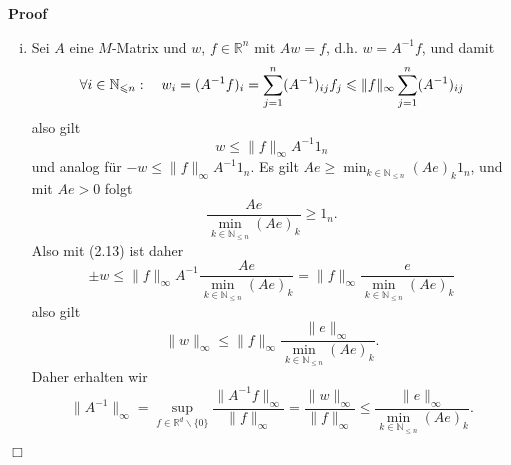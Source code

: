 \documentclass{book}
\newenvironment{enumerateroman}{\begin{enumerate}[i.] }{\end{enumerate}}
\newenvironment{proof}{\noindent\textbf{Proof\ }}{\hspace*{\fill}$\Box$\medskip}
\begin{document}
\begin{proof}
\begin{enumerateroman}
    Insgesamt ist $\| P \|_e = \sup_{\| x \|_e = 1} \| P x \|_e = \| P e \|_e
    = \max_{i \in \mathbb{N}_{\leqslant n}} \frac{(P e)_i}{e_i}$.
    
    Wegen $P e < e$ aus (2.12) gilt
    \[ \| P \|_e = \| P e \|_e < \| e \|_e = 1 \]
    und damit ist $I - P$ invertierbar wobei die Inverse mittels Neumann'sche
    Reihe darzustellen ist, also
    \[ (I - P)^{- 1} = \sum_{j = 0}^{\infty} P^j . \]
    {\hspace{1.7em}}Wegen $A = D (I - P)$ existiert auch $A^{- 1} = (I - P)^{-
    1} D^{- 1}$.
    
    Mit $P \geq 0$ ist $P^j \geqslant 0$ also $(I - P)^{- 1} \geq 0$, und da
    noch $D^{- 1} \geqslant$0, ist das Produkt $A^{- 1} = (I - P)^{- 1} D^{-
    1} \geqslant 0$, also ist $A$ inversmonoton.
    
    \item Sei $A$ eine $M$-Matrix und $w$, $f \in \mathbb{R}^n$ mit $A w = f$,
    d.h. $w = A^{- 1} f$, und damit
    \[ \forall i \in \mathbb{N}_{\leqslant n} : \text{\quad} w_i = (A^{- 1}
       f)_i = \sum_{j = 1}^n (A^{- 1})_{i j} f_j \leqslant \| f \|_{\infty}
       \sum_{j = 1}^n (A^{- 1})_{i j} \]
    also gilt
    \begin{equation}
      w \leqslant \| f \|_{\infty} A^{- 1} \mathscr{1}_n
    \end{equation}
    und analog f{\"u}r $- w \leqslant \| f \|_{\infty} A^{- 1}
    \mathscr{1}_n$.{\hspace{20em}} Es gilt $A e \geqslant \min_{k \in
    \mathbb{N}_{\leqslant n}} (A e)_k  \mathscr{1}_n$, und mit $A e > 0$ folgt
    \[ \frac{A e}{\min_{k \in \mathbb{N}_{\leqslant n}} (A e)_k} \geqslant
       \mathscr{1}_n . \]
    Also mit (2.13) ist daher
    \[ \pm w \leqslant \| f \|_{\infty} A^{- 1} \frac{A e}{\min_{k \in
       \mathbb{N}_{\leqslant n}} (A e)_k} = \| f \|_{\infty} \frac{e}{\min_{k
       \in \mathbb{N}_{\leqslant n}} (A e)_k} \]
    also gilt
    \[ \| w \|_{\infty} \leqslant \| f \|_{\infty} \frac{\| e
       \|_{\infty}}{\min_{k \in \mathbb{N}_{\leqslant n}} (A e)_k} . \]
    Daher erhalten wir
    \[ \| A^{- 1} \|_{\infty} = \sup_{f \in \mathbb{R}^d \backslash \{ 0 \}}
       \frac{\| A^{- 1} f \|_{\infty}}{\| f \|_{\infty}} = \frac{\| w
       \|_{\infty}}{\| f \|_{\infty}} \leqslant \frac{\| e
       \|_{\infty}}{\min_{k \in \mathbb{N}_{\leqslant n}} (A e)_k} . \]
  \end{enumerateroman}
\end{proof}
\end{document}
